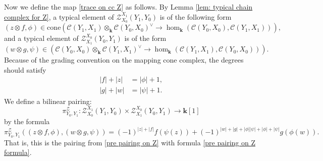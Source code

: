 \documentclass[11pt]{amsproc}
\def\K{{\mathbf{k}}}
\def\cZ{\mathcal{Z}}
\def\cc{\mathcal{C}}
\def\cone{\mathrm{cone}}
\theoremstyle{remark}
\numberwithin{equation}{section}
\begin{document}
Now we define the map \eqref{trace on cc Z} as follows.
By Lemma \ref{lem: typical chain complex for Z}, a typical element of $\cZ_{X_{0}}^{X_{1}}(Y_{1}, Y_{0})$ is of the following form
\begin{equation}
(z \otimes f, \phi) \in \cone(\cc(Y_{1}, X_{1}) \otimes_{\K} \cc(Y_{0}, X_{0})^{\vee}  \to \hom_{\K}(\cc(Y_{0}, X_{0}), \cc(Y_{1}, X_{1}))),
\end{equation}
and a typical element of $\cZ_{X_{1}}^{X_{0}}(Y_{0}, Y_{1})$ is of the form
\begin{equation}
(w \otimes g, \psi) \in ( \cc(Y_{0}, X_{0}) \otimes_{\K} \cc(Y_{1}, X_{1})^{\vee}  \to \hom_{\K}(\cc(Y_{1}, X_{1}), \cc(Y_{0}, X_{0}))).
\end{equation}
Because of the grading convention on the mapping cone complex, the degrees should satisfy
\begin{align}
|f| + |z| & = |\phi| +1, \label{grading relation on cone1}\\
|g| + |w| & = |\psi| +1. \label{grading relation on cone2}
\end{align}
We define a bilinear pairing:
\begin{equation}\label{pairing on Z}
\pi^{\cZ}_{Y_{0}, Y_{1}}: \cZ_{X_{0}}^{X_{1}}(Y_{1}, Y_{0}) \times \cZ_{X_{1}}^{X_{0}}(Y_{0}, Y_{1}) \to \K[1]
\end{equation}
by the formula
\begin{equation}\label{pairing on Z formula}
\pi^{\cZ}_{Y_{0}, Y_{1}}((z \otimes f, \phi), (w \otimes g, \psi) ) = (-1)^{|z| + |f|} f(\psi(z)) + (-1)^{|w| + |g| + |\phi||\psi| + |\phi| + |\psi|} g(\phi(w)).
\end{equation}
That is, this is the pairing from \eqref{pre pairing on Z} with formula \eqref{pre pairing on Z formula}.
\end{document}
